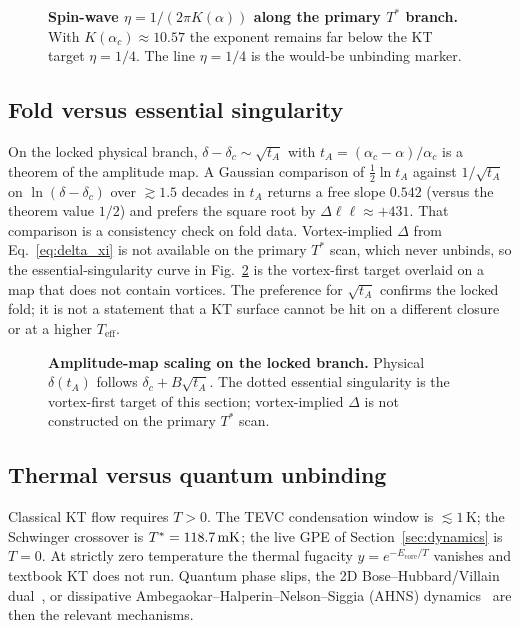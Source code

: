 \begin{figure}[htbp]
\centering

\caption{\textbf{Spin-wave $\eta=1/(2\pi K(\alpha))$ along the primary $T^*$ branch.} With $K(\alpha_c)\approx 10.57$ the exponent remains far below the KT target $\eta=1/4$. The line $\eta=1/4$ is the would-be unbinding marker.}
\label{fig:eta_eff}
\end{figure}

\subsection{Fold versus essential singularity}
\label{sec:c5}

On the locked physical branch, $\delta-\delta_c\sim\sqrt{t_A}$ with $t_A=(\alpha_c-\alpha)/\alpha_c$ is a theorem of the amplitude map. A Gaussian comparison of $\tfrac12\ln t_A$ against $1/\sqrt{t_A}$ on $\ln(\delta-\delta_c)$ over $\gtrsim 1.5$ decades in $t_A$ returns a free slope $0.542$ (versus the theorem value $1/2$) and prefers the square root by $\Delta\ell\ell\approx +431$. That comparison is a consistency check on fold data. Vortex-implied $\Delta$ from Eq.~\eqref{eq:delta_xi} is not available on the primary $T^*$ scan, which never unbinds, so the essential-singularity curve in Fig.~\ref{fig:delta_tA} is the vortex-first target overlaid on a map that does not contain vortices. The preference for $\sqrt{t_A}$ confirms the locked fold; it is not a statement that a KT surface cannot be hit on a different closure or at a higher $T_{\mathrm{eff}}$.

\begin{figure}[htbp]
\centering

\caption{\textbf{Amplitude-map scaling on the locked branch.} Physical $\delta(t_A)$ follows $\delta_c+B\sqrt{t_A}$. The dotted essential singularity is the vortex-first target of this section; vortex-implied $\Delta$ is not constructed on the primary $T^*$ scan.}
\label{fig:delta_tA}
\end{figure}

\subsection{Thermal versus quantum unbinding}
\label{sec:thermal_quantum}

Classical KT flow requires $T>0$. The TEVC condensation window is $\lesssim 1$\,K; the Schwinger crossover is $T^*=118.7\,\mathrm{mK}$; the live GPE of Section~\ref{sec:dynamics} is $T=0$. At strictly zero temperature the thermal fugacity $y=e^{-E_{\mathrm{core}}/T}$ vanishes and textbook KT does not run. Quantum phase slips, the 2D Bose--Hubbard/Villain dual~\cite{FisherWeichman1989}, or dissipative Ambegaokar--Halperin--Nelson--Siggia (AHNS) dynamics~\cite{Ambegaokar1980,HalperinNelson1978} are then the relevant mechanisms.

